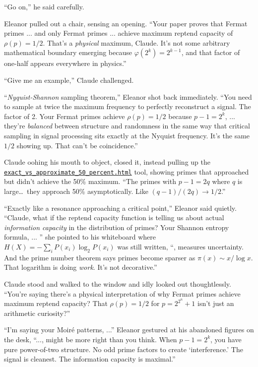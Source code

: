 ``Go on,'' he said carefully.

Eleanor pulled out a chair, sensing an opening. ``Your paper proves that Fermat primes ... and only Fermat primes ... achieve maximum reptend capacity of $\rho(p) = 1/2$. That's a \emph{physical} maximum, Claude. It's not some arbitrary mathematical boundary emerging because $\varphi(2^k) = 2^{k-1}$, and that factor of one-half appears everywhere in physics.''

``Give me an example,'' Claude challenged.

``\textit{Nyquist-Shannon} sampling theorem,'' Eleanor shot back immediately. ``You need to sample at twice the maximum frequency to perfectly reconstruct a signal. The factor of 2. Your Fermat primes achieve $\rho(p) = 1/2$ because $p-1 = 2^k$, ... they're \emph{balanced} between structure and randomness in the same way that critical sampling in signal processing sits exactly at the Nyquist frequency. It's the same $1/2$ showing up. That can't be coincidence.''

Claude oohing his mouth to object, closed it, instead pulling up the \href{exact_vs_approximate_50_percent.html}{\texttt{exact\_vs\_approximate\_50\_percent.html}} tool, showing primes that approached but didn't achieve the 50\% maximum. ``The primes with $p-1 = 2q$ where $q$ is large\ldots\ they approach 50\% asymptotically. Like $(q-1)/(2q) \to 1/2$.''

``Exactly like a resonance approaching a critical point,'' Eleanor said quietly. ``Claude, what if the reptend capacity function is telling us about actual \emph{information capacity} in the distribution of primes? Your Shannon entropy formula, ... '' she pointed to his whiteboard where $H(X) = -\sum_i P(x_i) \log_2 P(x_i)$ was still written, ``, measures uncertainty. And the prime number theorem says primes become sparser as $\pi(x) \sim x/\log x$. That logarithm is doing \emph{work}. It's not decorative.''

Claude stood and walked to the window and idly looked out thoughtlessly. ``You're saying there's a physical interpretation of why Fermat primes achieve maximum reptend capacity? That $\rho(p) = 1/2$ for $p = 2^{2^n} + 1$ isn't just an arithmetic curiosity?''

``I'm saying your Moiré patterns, ...'' Eleanor gestured at his abandoned figures on the desk, ``..., might be more right than you think. When $p-1 = 2^k$, you have pure power-of-two structure. No odd prime factors to create `interference.' The signal is cleanest. The information capacity is maximal.''

